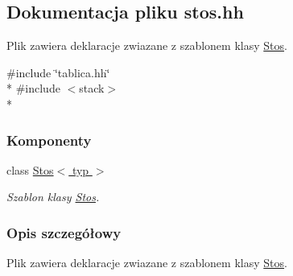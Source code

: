 \hypertarget{stos_8hh}{\subsection{Dokumentacja pliku stos.\-hh}
\label{stos_8hh}
}


Plik zawiera deklaracje zwiazane z szablonem klasy \hyperlink{class_stos}{Stos}.  


{\ttfamily \#include \char`\"{}tablica.\-hh\char`\"{}}\\*
{\ttfamily \#include $<$stack$>$}\\*
\subsubsection*{Komponenty}
\begin{DoxyCompactItemize}
\item 
class \hyperlink{class_stos}{Stos$<$ typ $>$}
\begin{DoxyCompactList}\small\item\em Szablon klasy \hyperlink{class_stos}{Stos}. \end{DoxyCompactList}\end{DoxyCompactItemize}


\subsubsection{Opis szczegółowy}
Plik zawiera deklaracje zwiazane z szablonem klasy \hyperlink{class_stos}{Stos}. 
